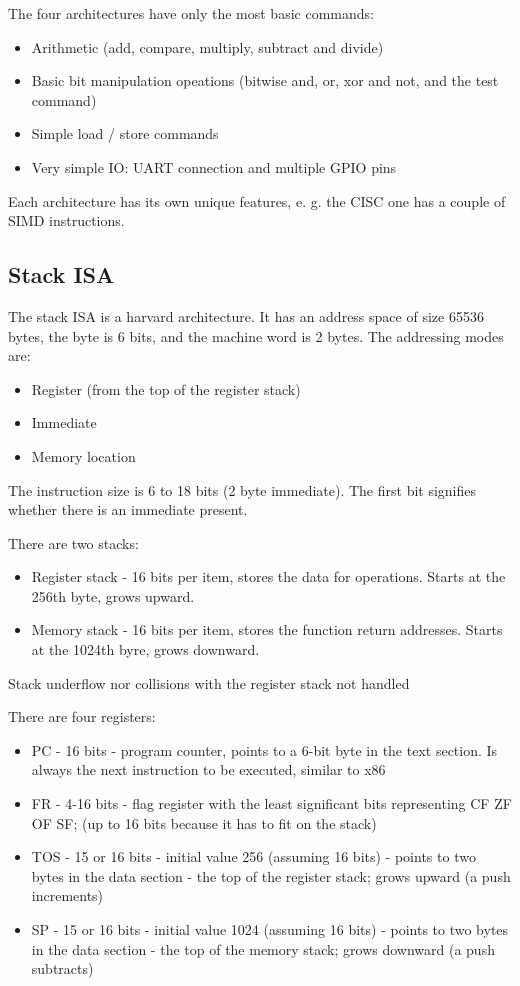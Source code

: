 \documentclass[conference]{IEEEtran}
\begin{document}
The four architectures have only the most basic commands:
\begin{itemize}
	\item Arithmetic (add, compare, multiply, subtract and divide)
	\item Basic bit manipulation opeations (bitwise and, or, xor and not, and the test command)
	\item Simple load / store commands
	\item Very simple IO: UART connection and multiple GPIO pins
\end{itemize}

Each architecture has its own unique features, e. g. the CISC one has a couple of SIMD instructions.

\subsection {Stack ISA \cite{b4}}
The stack ISA is a harvard architecture.
It has an address space of size 65536 bytes, the byte is 6 bits,
and the machine word is 2 bytes. The addressing modes are:
\begin{itemize}
	\item Register (from the top of the register stack)
	\item Immediate
	\item Memory location
\end{itemize}

The instruction size is 6 to 18 bits (2 byte immediate). The first bit signifies whether there is an immediate present.

There are two stacks:
\begin{itemize}
	\item Register stack - 16 bits per item, stores the data for operations.
	      Starts at the 256th byte, grows upward.
	\item Memory stack - 16 bits per item, stores the function return addresses.
	      Starts at the 1024th byre, grows downward.
\end{itemize}

Stack underflow nor collisions with the register stack not handled


\newpage
There are four registers:
\begin{itemize}
	\item PC - 16 bits - program counter, points to a 6-bit byte in the text section. Is always the next instruction to be executed, similar to x86
	\item FR - 4-16 bits - flag register with the least significant bits representing CF ZF OF SF; (up to 16 bits because it has to fit on the stack)
	\item TOS - 15 or 16 bits - initial value 256 (assuming 16 bits) - points to two bytes in the data section - the top of the register stack; grows upward (a push increments)
	\item SP - 15 or 16 bits - initial value 1024 (assuming 16 bits) - points to two bytes in the data section - the top of the memory stack; grows downward (a push subtracts)
\end{itemize}
\end{document}
